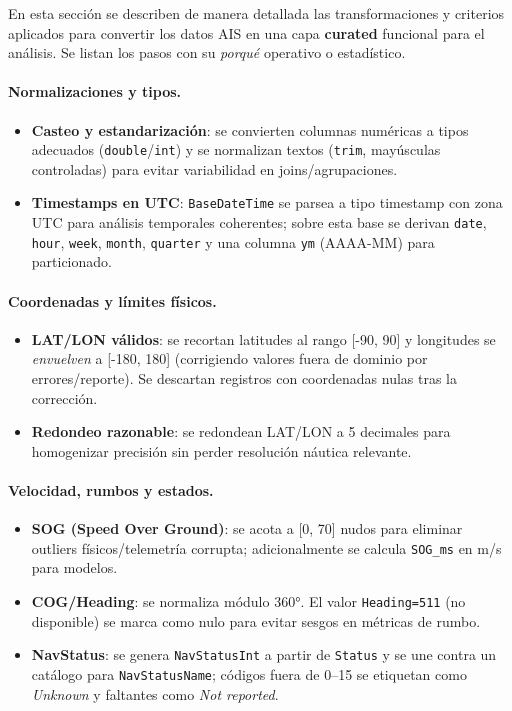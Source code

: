 \documentclass[10pt]{article}
\begin{document}
En esta sección se describen de manera detallada las transformaciones y criterios aplicados para convertir los datos AIS en una capa \textbf{curated} funcional para el análisis. Se listan los pasos con su \emph{porqué} operativo o estadístico.

\paragraph{Normalizaciones y tipos.}
\begin{itemize}
  \item \textbf{Casteo y estandarización}: se convierten columnas numéricas a tipos adecuados (\texttt{double}/\texttt{int}) y se normalizan textos (\texttt{trim}, mayúsculas controladas) para evitar variabilidad en joins/agrupaciones.
  \item \textbf{Timestamps en UTC}: \texttt{BaseDateTime} se parsea a tipo timestamp con zona UTC para análisis temporales coherentes; sobre esta base se derivan \texttt{date}, \texttt{hour}, \texttt{week}, \texttt{month}, \texttt{quarter} y una columna \texttt{ym} (AAAA-MM) para particionado.
\end{itemize}

\paragraph{Coordenadas y límites físicos.}
\begin{itemize}
  \item \textbf{LAT/LON válidos}: se recortan latitudes al rango [-90, 90] y longitudes se \emph{envuelven} a [-180, 180] (corrigiendo valores fuera de dominio por errores/reporte). Se descartan registros con coordenadas nulas tras la corrección.
  \item \textbf{Redondeo razonable}: se redondean LAT/LON a 5 decimales para homogenizar precisión sin perder resolución náutica relevante.
\end{itemize}

\paragraph{Velocidad, rumbos y estados.}
\begin{itemize}
  \item \textbf{SOG (Speed Over Ground)}: se acota a [0, 70] nudos para eliminar outliers físicos/telemetría corrupta; adicionalmente se calcula \texttt{SOG\_ms} en m/s para modelos.
  \item \textbf{COG/Heading}: se normaliza módulo 360°. El valor \texttt{Heading=511} (no disponible) se marca como nulo para evitar sesgos en métricas de rumbo.
  \item \textbf{NavStatus}: se genera \texttt{NavStatusInt} a partir de \texttt{Status} y se une contra un catálogo para \texttt{NavStatusName}; códigos fuera de 0–15 se etiquetan como \textit{Unknown} y faltantes como \textit{Not reported}.
\end{itemize}
\end{document}
